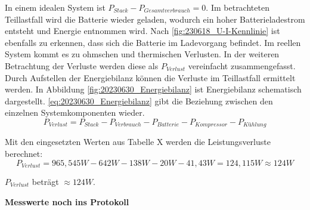 In einem idealen System ist $P_{Stack}-P_{Gesamtverbrauch}=0$. Im betrachteten Teillastfall wird die Batterie wieder geladen, wodurch ein hoher Batterieladestrom entsteht und Energie entnommen wird.
Nach \autoref{fig:230618_U-I-Kennlinie} ist ebenfalls zu erkennen, dass sich die Batterie im Ladevorgang befindet. 
Im reellen System kommt es zu ohmschen und thermischen Verlusten. In der weiteren Betrachtung der Verluste werden diese als $P_{Verlust}$ vereinfacht zusammengefasst.
Durch Aufstellen der Energiebilanz können die Verluste im Teillastfall ermittelt werden.
In Abbildung \autoref{fig:20230630_Energiebilanz} ist Energiebilanz schematisch dargestellt.
\autoref{eq:20230630_Energiebilanz} gibt die Beziehung zwischen den einzelnen Systemkomponenten wieder.
\begin{equation}
  P_{Verlust} = P_{Stack}-P_{Verbrauch}-P_{Batterie}-P_{Kompressor}-P_{Kühlung}
\label{eq:20230630_Energiebilanz}
\end{equation}

Mit den eingesetzten Werten aus Tabelle X werden die Leistungsverluste berechnet:
$$P_{Verlust}=965,545W-642W-138W-20W-41,43W=124,115W \approx 124W$$

$P_{Verlust}$ beträgt $\approx124W$.

\textbf{Messwerte noch ins Protokoll}